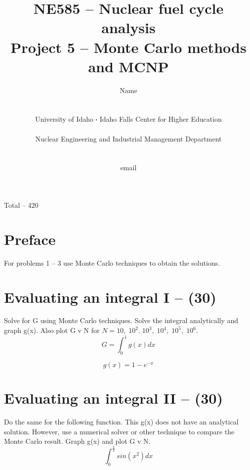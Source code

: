 \documentclass[11pt,a4paper]{article}
\newcommand*\sq{\mathbin{\vcenter{\hbox{\rule{.3ex}{.3ex}}}}} %
\begin{document}
\begin{titlepage}
    \title{
        NE585 -- Nuclear fuel cycle analysis\\
        Project 5 -- Monte Carlo methods and MCNP\\
    }
    \author{
        Name
        \\ \\ \\
        University of Idaho $\sq$ Idaho Falls Center for Higher Education
        \\ \\
        Nuclear Engineering and Industrial Management Department
        \\ \\ \\
        email 
    }
\clearpage %
\maketitle
\vspace*{\fill}
\begin{flushright}{
        Total -- 420 
}
\end{flushright}
\thispagestyle{empty} %
\end{titlepage}


\section*{Preface}
For problems 1 -- 3 use Monte Carlo techniques to obtain the solutions.

\newpage

\section{Evaluating an integral I -- (30)}
Solve for G using Monte Carlo techniques. Solve the integral analytically and graph g(x). Also plot G v N for $N = 10,\;10^2.\;10^3,\;10^4,\;10^5,\;10^6$.
\begin{equation}
    G = \int_0^1 g(x)dx 
\end{equation}

\begin{equation}
    g(x)=1-e^{-x}
\end{equation}





\newpage

\section{Evaluating an integral II -- (30)}
Do the same for the following function. This g(x) does not have an analytical solution. However, use a numerical solver or other technique to compare the Monte Carlo result. Graph g(x) and plot G v N.
\begin{equation}
    \int_0^{\frac{\pi}{2}}sin(x^2)dx
\end{equation}
\end{document}

